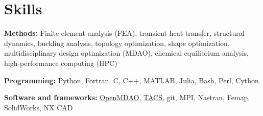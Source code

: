 \section{Skills}
\begin{onecolentry}
    \textbf{Methods:} Finite-element analysis (FEA), transient heat transfer, structural dynamics, buckling analysis, topology optimization, shape optimization, multidisciplinary design optimization (MDAO), chemical equilibrium analysis, high-performance computing (HPC)
\end{onecolentry}

\begin{onecolentry}
    \textbf{Programming:} Python, Fortran, C, C++, MATLAB, Julia, Bash, Perl, Cython
\end{onecolentry}

\begin{onecolentry}
    \textbf{Software and frameworks:} \href{https://github.com/OpenMDAO/OpenMDAO}{OpenMDAO}, \href{https://github.com/smdogroup/tacs}{TACS}, git, MPI, Nastran, Femap, SolidWorks, NX CAD
\end{onecolentry}
